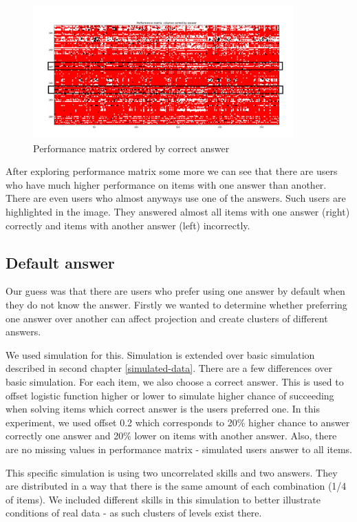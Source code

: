 \documentclass[
  digital, %
  table,   %
  nolof,     %
  nolot,     %
  nocover
]{fithesis3}
\begin{document}
\begin{figure}
  \includegraphics[width=10cm]{img/performance_matrix}
  \caption{Performance matrix ordered by correct answer}
  \label{fig:performance_matrix}
\end{figure}

After exploring performance matrix some more we can see that there are users who have much higher performance on items with one answer than another. There are even users who almost anyways use one of the answers. Such users are highlighted in the image. They answered almost all items with one answer (right) correctly and items with another answer (left) incorrectly.


\subsection{Default answer}\label{default-answer}

Our guess was that there are users who prefer using one answer by default when they do not know the answer. Firstly we wanted to determine whether preferring one answer over another can affect projection and create clusters of different answers.

We used simulation for this. Simulation is extended over basic simulation described in second chapter \ref{simulated-data}. There are a few differences over basic simulation. For each item, we also choose a correct answer. This is used to offset logistic function higher or lower to simulate higher chance of succeeding when solving items which correct answer is the users preferred one. In this experiment, we used offset 0.2 which corresponds to 20\% higher chance to answer correctly one answer and 20\% lower on items with another answer. Also, there are no missing values in performance matrix - simulated users answer to all items.

This specific simulation is using two uncorrelated skills and two answers. They are distributed in a way that there is the same amount of each combination (1/4 of items). We included different skills in this simulation to better illustrate conditions of real data - as such clusters of levels exist there.
\end{document}
